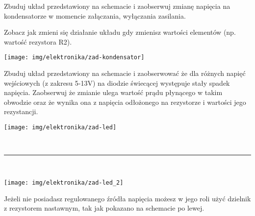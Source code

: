 %
%

\dbEntryCheckResults
\noindent\begin{minipage}[b]{0.55\textwidth}
Zbuduj układ przedstawiony na schemacie i zaobserwuj zmianę napięcia na kondensatorze w momencie załączania, wyłączania zasilania.

\vspace{13pt}

Zobacz jak zmieni się działanie układu gdy zmienisz wartości elementów (np. wartość rezystora R2).

\ifdefined\ladowanieKondensatoraWartosci\vspace{13pt}\ladowanieKondensatoraWartosci\fi
\end{minipage}
\hfill
\begin{minipage}[b]{0.4\textwidth}
\texttt{[image: img/elektronika/zad-kondensator]}
\end{minipage}
\fi


\dbEntryCheckResults
\noindent\begin{minipage}[b]{0.7\textwidth}
Zbuduj układ przedstawiony na schemacie i zaobserwować że dla różnych napięć wejściowych (z zakresu 5-13V) na diodzie świecącej występuje stały spadek napięcia.
Zaobserwuj że zmianie ulega wartość prądu płynącego w takim obwodzie oraz że wynika ona z napięcia odłożonego na rezystorze i wartości jego rezystancji.
\end{minipage}
\hfill
\begin{minipage}[b]{0.25\textwidth}
\texttt{[image: img/elektronika/zad-led]}\vspace{0.5cm}
\end{minipage}

\hfill \rule{0.8\textwidth}{.3pt}\hfill 

\noindent\begin{minipage}[b]{0.27\textwidth}
\texttt{[image: img/elektronika/zad-led\_2]}
\end{minipage}
\hfill
\begin{minipage}[b]{0.6\textwidth}
Jeżeli nie posiadasz regulowanego źródła napięcia możesz w jego roli użyć dzielnik z rezystorem nastawnym, tak jak pokazano na schemacie po lewej.
\vspace{1.3cm}
\end{minipage}
\hfill 
\fi


